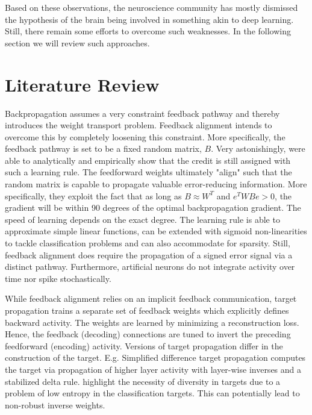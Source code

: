 \documentclass[colorinlistoftodos]{article}
\theoremstyle{definition}
\begin{document}
Based on these observations, the neuroscience community has mostly dismissed the hypothesis of the brain being involved in something akin to deep learning. Still, there remain some efforts to overcome such weaknesses. In the following section we will review such approaches.

\newpage
\section{Literature Review}

Backpropagation assumes a very constraint feedback pathway and thereby introduces the weight transport problem. Feedback alignment \citep{lillicrap2016} intends to overcome this by completely loosening this constraint. More specifically, the feedback pathway is set to be a fixed random matrix, $B$. Very astonishingly, \citet{lillicrap2016} were able to analytically and empirically show that the credit is still assigned with such a learning rule.
The feedforward weights ultimately "align" such that the random matrix is capable to propagate valuable error-reducing information. More specifically, they exploit the fact that as long as $B \approx W^T$ and $e^TWBe > 0$, the gradient will be within 90 degrees of the optimal backpropagation gradient. The speed of learning depends on the exact degree.
The learning rule is able to approximate simple linear functions, can be extended with sigmoid non-linearities to tackle classification problems and can also accommodate for sparsity.
Still, feedback alignment does require the propagation of a signed error signal via a distinct pathway. Furthermore, artificial neurons do not integrate activity over time nor spike stochastically.

While feedback alignment relies on an implicit feedback communication, target propagation \citep{lee2015} trains a separate set of feedback weights which explicitly defines backward activity. The weights are learned by minimizing a reconstruction loss. Hence, the feedback (decoding) connections are tuned to invert the preceding feedforward (encoding) activity. 
Versions of target propagation differ in the construction of the target. E.g. Simplified difference target propagation \citep{bartunov2018} computes the target via propagation of higher layer activity with layer-wise inverses and a stabilized delta rule. \citet{bartunov2018} highlight the necessity of diversity in targets due to a problem of low entropy in the classification targets. This can potentially lead to non-robust inverse weights.
\end{document}
